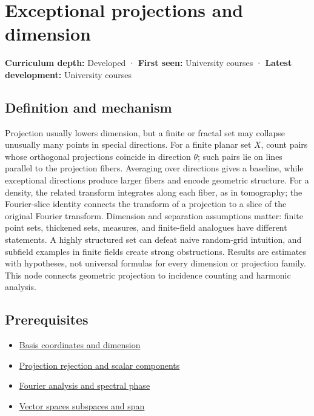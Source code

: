 \hypertarget{appendix-3c73f7862157}{}\label{referencestart:appendix-3c73f7862157}
\section{Exceptional projections and dimension}\label{appendix-3c73f7862157-exceptional-projections-and-dimension}

\textbf{Curriculum depth:} Developed · \textbf{First seen:} University courses · \textbf{Latest development:} University courses

\subsection{Definition and mechanism}\label{appendix-3c73f7862157-definition-and-mechanism}

Projection usually lowers dimension, but a finite or fractal set may collapse unusually many points in special directions. For a finite planar set \(X\), count pairs whose orthogonal projections coincide in direction \(\theta\); such pairs lie on lines parallel to the projection fibers. Averaging over directions gives a baseline, while exceptional directions produce larger fibers and encode geometric structure. For a density, the related transform integrates along each fiber, as in tomography; the Fourier-slice identity connects the transform of a projection to a slice of the original Fourier transform. Dimension and separation assumptions matter: finite point sets, thickened sets, measures, and finite-field analogues have different statements. A highly structured set can defeat naive random-grid intuition, and subfield examples in finite fields create strong obstructions. Results are estimates with hypotheses, not universal formulas for every dimension or projection family. This node connects geometric projection to incidence counting and harmonic analysis.

\subsection{Prerequisites}\label{appendix-3c73f7862157-prerequisites}

\begin{itemize}
\tightlist
\item
  \hyperref[appendix-ce0341f7ea0d]{Basis coordinates and dimension}
\item
  \hyperref[appendix-505a502c372a]{Projection rejection and scalar components}
\item
  \hyperref[appendix-b60686ba06a1]{Fourier analysis and spectral phase}
\item
  \hyperref[appendix-173b52c063ae]{Vector spaces subspaces and span}
\end{itemize}

